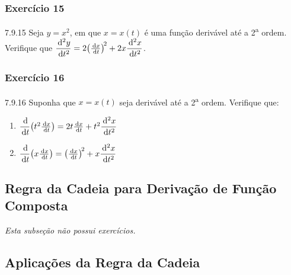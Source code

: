 \subsubsection*{Exercício 15}
\begin{exercicio}[15]{7.9.15}
Seja $y = x^2$, em que $x = x(t)$ é uma função derivável até a 2\textsuperscript{a} ordem. Verifique que $\dfrac{\,\mathrm{d}^2 y}{\,\mathrm{d} t^2} = 2\!\left(\frac{\,\mathrm{d} x}{\,\mathrm{d} t}\right)^{\!2} + 2x\dfrac{\,\mathrm{d}^2 x}{\,\mathrm{d} t^2}$.
\end{exercicio}

\subsubsection*{Exercício 16}
\begin{exercicio}[16]{7.9.16}
Suponha que $x = x(t)$ seja derivável até a 2\textsuperscript{a} ordem. Verifique que:
\begin{enumerate}[label=\alph*)]
    \item $\dfrac{\,\mathrm{d}}{\,\mathrm{d} t}\!\left(t^2 \frac{\,\mathrm{d} x}{\,\mathrm{d} t}\right) = 2t\frac{\,\mathrm{d} x}{\,\mathrm{d} t} + t^2 \dfrac{\,\mathrm{d}^2 x}{\,\mathrm{d} t^2}$
    \item $\dfrac{\,\mathrm{d}}{\,\mathrm{d} t}\!\left(x \frac{\,\mathrm{d} x}{\,\mathrm{d} t}\right) = \left(\frac{\,\mathrm{d} x}{\,\mathrm{d} t}\right)^{\!2} + x\dfrac{\,\mathrm{d}^2 x}{\,\mathrm{d} t^2}$
\end{enumerate}
\end{exercicio}

\clearpage

\subsection{Regra da Cadeia para Derivação de Função Composta}
\textit{Esta subseção não possui exercícios.}

\clearpage

\subsection{Aplicações da Regra da Cadeia}

